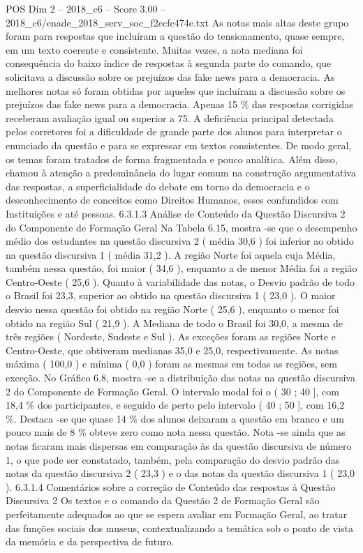 \begin{textsample}{POS Dim 2 – 2018\_c6 – Score 3.00 – 2018\_c6/enade\_2018\_serv\_soc\_f2ecfc474e.txt}
As notas mais altas deste grupo foram para respostas que incluíram a questão do tensionamento, quase sempre, em um texto coerente e consistente.
Muitas vezes, a nota mediana foi consequência do baixo índice de respostas à segunda parte do comando, que solicitava a discussão sobre os prejuízos das fake news para a democracia.
As melhores notas só foram obtidas por aqueles que incluíram a discussão sobre os prejuízos das fake news para a democracia.
Apenas 15 \% das respostas corrigidas receberam avaliação igual ou superior a 75.
A deficiência principal detectada pelos corretores foi a dificuldade de grande parte dos alunos para interpretar o enunciado da questão e para se expressar em textos consistentes.
De modo geral, os temas foram tratados de forma fragmentada e pouco analítica.
Além disso, chamou à atenção a predominância do lugar comum na construção argumentativa das respostas, a superficialidade do debate em torno da democracia e o desconhecimento de conceitos como Direitos Humanos, esses confundidos com Instituições e até pessoas. 6.3.1.3 Análise de Conteúdo da Questão Discursiva 2 do Componente de Formação Geral Na Tabela 6.15, mostra -se que o desempenho médio dos estudantes na questão discursiva 2 ( média 30,6 ) foi inferior ao obtido na questão discursiva 1 ( média 31,2 ).
A região Norte foi aquela cuja Média, também nessa questão, foi maior ( 34,6 ), enquanto a de menor Média foi a região Centro-Oeste ( 25,6 ).
Quanto à variabilidade das notas, o Desvio padrão de todo o Brasil foi 23,3, superior ao obtido na questão discursiva 1 ( 23,0 ).
O maior desvio nessa questão foi obtido na região Norte ( 25,6 ), enquanto o menor foi obtido na região Sul ( 21,9 ).
A Mediana de todo o Brasil foi 30,0, a mesma de três regiões ( Nordeste, Sudeste e Sul ).
As exceções foram as regiões Norte e Centro-Oeste, que obtiveram medianas 35,0 e 25,0, respectivamente.
As notas máxima ( 100,0 ) e mínima ( 0,0 ) foram as mesmas em todas as regiões, sem exceção.
No Gráfico 6.8, mostra -se a distribuição das notas na questão discursiva 2 do Componente de Formação Geral.
O intervalo modal foi o ( 30 ; 40 ], com 18,4 \% dos participantes, e seguido de perto pelo intervalo ( 40 ; 50 ], com 16,2 \%.
Destaca -se que quase 14 \% dos alunos deixaram a questão em branco e um pouco mais de 8 \% obteve zero como nota nessa questão.
Nota -se ainda que as notas ficaram mais dispersas em comparação às da questão discursiva de número 1, o que pode ser constatado, também, pela comparação do desvio padrão das notas da questão discursiva 2 ( 23,3 ) e o das notas da questão discursiva 1 ( 23,0 ). 6.3.1.4 Comentários sobre a correção de Conteúdo das respostas à Questão Discursiva 2 Os textos e o comando da Questão 2 de Formação Geral são perfeitamente adequados ao que se espera avaliar em Formação Geral, ao tratar das funções sociais dos museus, contextualizando a temática sob o ponto de vista da memória e da perspectiva de futuro.

\end{textsample}
